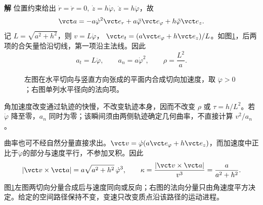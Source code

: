 \documentclass[11pt,openany,fontset=fandol]{ctexbook}
\theoremstyle{definition}\newtheorem{example}{例}[chapter]\newtheorem{exercise}{习题}[chapter]
\newcommand{\SolutionStart}{\par\medskip\ifdim\pagetotal>0pt\ifdim\dimexpr\pagegoal-\pagetotal\relax<3\baselineskip\newpage\fi\fi\noindent\textbf{解}\quad\ignorespaces}
\newenvironment{solution}{\SolutionStart}{\par\medskip}
\begin{document}
\begin{solution}
位置约束给出 $\dot r=\ddot r=0,\ \dot z=h\dot\varphi,\ \ddot z=h\ddot\varphi$，故
\[
\vct a=-a\dot\varphi^2\vct e_r
+a\ddot\varphi\vct e_\varphi+h\ddot\varphi\vct e_z.
\]
记 $L=\sqrt{a^2+h^2}$，则 $v=L\dot\varphi$，
$\vct e_t=(a\vct e_\varphi+h\vct e_z)/L$。如图\ref{mp3:fig:l3-p7-s}，后两项的合矢量恰沿切线，第一项沿主法线。因此
\[
a_t=L\ddot\varphi,\qquad a_n=a\dot\varphi^2,\qquad
\rho=\frac{L^2}{a}.
\]

\begin{figure}[H]\centering
{}
\caption{左图在水平切向与竖直方向张成的平面内合成切向加速度，取 $\ddot\varphi>0$；右图单列水平径向的法向项。}\label{mp3:fig:l3-p7-s}
\end{figure}


角加速度改变通过轨迹的快慢，不改变轨迹本身，因而不改变 $\rho$ 或 $\tau=h/L^2$。若 $\dot\varphi$ 降至零，$a_n$ 同时为零；该瞬间须由两侧轨迹确定几何曲率，不直接计算 $v^2/a_n$。

曲率也可不经自然分量直接求出。$\vct v=\dot\varphi(a\vct e_\varphi+h\vct e_z)$，而加速度中正比于$\ddot\varphi$的部分与速度平行，不参加叉积。因此
\[
 |\vct v\times\vct a|=a\sqrt{a^2+h^2}\,\dot\varphi^3,
 \qquad
 \kappa=\frac{|\vct v\times\vct a|}{v^3}
 =\frac a{a^2+h^2}.
\]
图\ref{mp3:fig:l3-p7-s}左图两切向分量合成后与速度同向或反向；右图的法向分量只由角速度平方决定。给定的空间路径保持不变，变速只改变质点沿该路径的运动进程。
\end{solution}
\end{document}
